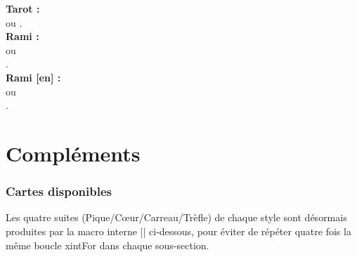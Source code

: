 \documentclass[a4paper]{article}
\newcommand\cmaj[1]{\tcbox[vignetteMaJ]{#1}\xspace}
\begin{document}
\begin{codetex}[]
\textbf{\large Tarot : }\\
 ou .\\

\textbf{\large Rami : }\\
 ou\\
.\\

\textbf{\large Rami [en] : }\\
 ou\\
.
\end{codetex}

\pagebreak

\part{Compléments}

\section{Cartes disponibles}

\cmaj{0.40a} Les quatre suites (Pique/Cœur/Carreau/Trèfle) de chaque style sont désormais produites par la macro interne \bverb|| ci-dessous, pour éviter de répéter quatre fois la même boucle \textsf{xintFor} dans chaque sous-section.

\begin{codetex}
\newcommand\GalerieSuites[1]{%
  \xintFor ##1 in {2,3,4,5,6,7,8,9,10,V,D,R,A}\do{\AffCarteJeu[Hauteur=1.75,StyleJeu=#1]{##1P}}
  \xintFor ##1 in {2,3,4,5,6,7,8,9,10,V,D,R,A}\do{\AffCarteJeu[Hauteur=1.75,StyleJeu=#1]{##1C}}
  \xintFor ##1 in {2,3,4,5,6,7,8,9,10,V,D,R,A}\do{\AffCarteJeu[Hauteur=1.75,StyleJeu=#1]{##1K}}
  \xintFor ##1 in {2,3,4,5,6,7,8,9,10,V,D,R,A}\do{\AffCarteJeu[Hauteur=1.75,StyleJeu=#1]{##1T}}
}
\end{codetex}

\newcommand\GalerieSuites[1]{%
\xintFor ##1 in {2,3,4,5,6,7,8,9,10,V,D,R,A}\do{\AffCarteJeu[Hauteur=1.75,StyleJeu=#1]{##1P}}

\xintFor ##1 in {2,3,4,5,6,7,8,9,10,V,D,R,A}\do{\AffCarteJeu[Hauteur=1.75,StyleJeu=#1]{##1C}}

\xintFor ##1 in {2,3,4,5,6,7,8,9,10,V,D,R,A}\do{\AffCarteJeu[Hauteur=1.75,StyleJeu=#1]{##1K}}

\xintFor ##1 in {2,3,4,5,6,7,8,9,10,V,D,R,A}\do{\AffCarteJeu[Hauteur=1.75,StyleJeu=#1]{##1T}}
}
\end{document}
